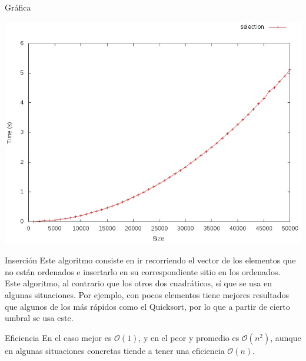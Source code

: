 \documentclass[compress]{beamer}
\begin{document}
\begin{frame}{Gráfica}
	\begin{alertblock}{}
		\begin{center}
		\includegraphics[scale=0.40]{images/selection.jpeg}
		\end{center}
	\end{alertblock}
\end{frame}

\begin{frame}{Inserción}
Este algoritmo consiste en ir recorriendo el vector de los elementos que no están ordenados e insertarlo en su correspondiente sitio en los ordenados.\\
\vspace{0.20in}
Este algoritmo, al contrario que los otros dos cuadráticos, sí que se usa en algunas situaciones. Por ejemplo, con pocos elementos tiene mejores resultados que algunos de los más rápidos como el Quicksort, por lo que a partir de cierto umbral se usa este.\\
\vspace{0.20in}
	\begin{block}{Eficiencia}
	En el caso mejor es $\mathcal{O}(1)$, y en el peor y promedio es $\mathcal{O}(n^2)$, aunque en algunas situaciones concretas tiende a tener una eficiencia $\mathcal{O}(n)$.
	\end{block}
\end{frame}
\end{document}
